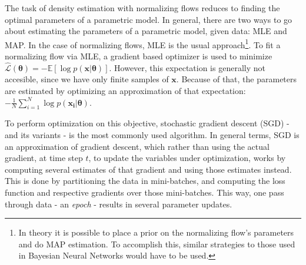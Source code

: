 The task of density estimation with normalizing flows reduces to finding the
optimal parameters of a parametric model. In general, there are two ways to go about estimating
the parameters of a parametric model,
given data: MLE and MAP. In the case of normalizing flows, MLE is the usual
approach\footnote{In theory it is possible to place a prior on the normalizing
flow's parameters and do MAP estimation. To accomplish this, similar strategies
to those used in Bayesian Neural Networks would have to be used.}. To fit a normalizing
flow via MLE, a gradient based optimizer is used to minimize
$\hat{\mathcal{L}}(\bm\theta) = - \mathbb{E}[\log p(\bm{x}|\bm\theta)]$.
However, this expectation is generally not accesible, since we have only
finite samples of $\bm{x}$. Because of that, the parameters are estimated
by optimizing an approximation of that expectation: $ - \frac{1}{N} \sum_{i=1}^N \log p(\bm{x_i} | \bm\theta)$.

To perform optimization on this objective, stochastic gradient descent (SGD) - and
its variants -  is the most commonly used algorithm. In general terms, SGD is an
approximation of gradient descent, which rather than using the actual gradient,
at time step $t$, to update the variables under optimization, works by computing
several estimates of that gradient and using those estimates instead. This is
done by partitioning the data in mini-batches, and computing the loss function
and respective gradients over those mini-batches. This way, one pass through
data - an \emph{epoch} - results in several parameter updates.
